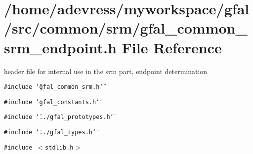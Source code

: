 \section{/home/adevress/myworkspace/gfal/src/common/srm/gfal\_\-common\_\-srm\_\-endpoint.h File Reference}
\label{gfal__common__srm__endpoint_8h}
header file for internal use in the srm part, endpoint determination 

{\tt \#include \char`\"{}gfal\_\-common\_\-srm.h\char`\"{}}\par
{\tt \#include \char`\"{}gfal\_\-constants.h\char`\"{}}\par
{\tt \#include \char`\"{}../gfal\_\-prototypes.h\char`\"{}}\par
{\tt \#include \char`\"{}../gfal\_\-types.h\char`\"{}}\par
{\tt \#include $<$stdlib.h$>$}\par
